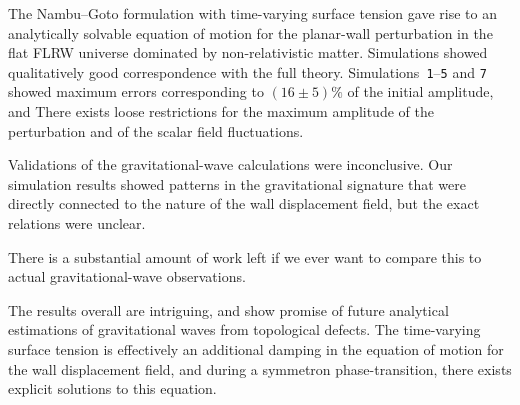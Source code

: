 








The Nambu--Goto formulation with time-varying surface tension gave rise to an analytically solvable equation of motion for the planar-wall perturbation in the flat FLRW universe dominated by non-relativistic matter. Simulations showed qualitatively good correspondence with the full theory. Simulations~\texttt{1}--\texttt{5} and \texttt{7} showed maximum errors corresponding to $(16\pm 5)\%$ of the initial amplitude, and 
There exists loose restrictions for the maximum amplitude of the perturbation and of the scalar field fluctuations. 

Validations of the gravitational-wave calculations were inconclusive. Our simulation results showed patterns in the gravitational signature that were directly connected to the nature of the wall displacement field, but the exact relations were unclear. 


There is a substantial amount of work left if we ever want to compare this to actual gravitational-wave observations.

The results overall are intriguing, and show promise of future analytical estimations of gravitational waves from topological defects. The time-varying surface tension is effectively an additional damping in the equation of motion for the wall displacement field, and during a symmetron phase-transition, there exists explicit solutions to this equation.




